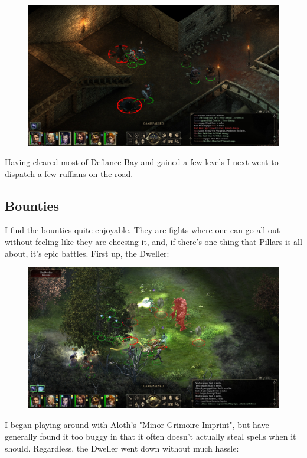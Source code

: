 \documentclass{article}
\begin{document}
\begin{figure}
\includegraphics[scale=0.33]{files/blog/2018_11_25_pillars_of_eternity_path_of_the_damned_act_ii/2018_11_25_catacombs.jpg}
\end{figure}

Having cleared most of Defiance Bay and gained a few levels I next went to dispatch a few ruffians on the road.

\subsection{Bounties}
I find the bounties quite enjoyable.  They are fights where one can go all-out without feeling like they are cheesing it, and, if there's one thing that Pillars is all about, it's epic battles.  First up, the Dweller:

\begin{figure}
\includegraphics[scale=0.33]{files/blog/2018_11_25_pillars_of_eternity_path_of_the_damned_act_ii/2018_11_25_dweller_begin.jpg}
\end{figure}

I began playing around with Aloth's "Minor Grimoire Imprint", but have generally found it too buggy in that it often doesn't actually steal spells when it should.  Regardless, the Dweller went down without much hassle:
\end{document}
